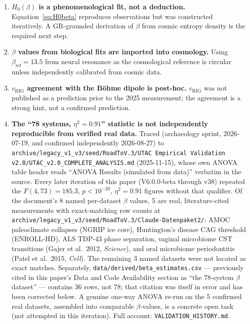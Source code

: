 \documentclass[12pt,a4paper]{article}
\theoremstyle{definition}
\newcommand{\betaref}{\beta_{\mathrm{ref}}}
\newcommand{\vrig}{v_{\mathrm{RIG}}}
\begin{document}
\begin{enumerate}[leftmargin=2em, label=\arabic*.]
  \item \textbf{$H_0(\beta)$ is a phenomenological fit, not a deduction.}
        Equation~\eqref{eq:H0beta} reproduces observations but was
        constructed iteratively. A GR-grounded derivation of $\beta$
        from cosmic entropy density is the required next step.

  \item \textbf{$\beta$ values from biological fits are imported into cosmology.}
        Using $\betaref = 13.5$ from neural resonance as the cosmological
        reference is circular unless independently calibrated from cosmic data.

  \item \textbf{$\vrig$ agreement with the Böhme dipole is post-hoc.}
        $\vrig$ was not published as a prediction prior to the 2025 measurement;
        the agreement is a strong hint, not a confirmed prediction.

  \item \textbf{The ``78 systems, $\eta^2=0.91$'' statistic is not independently
        reproducible from verified real data.}
        Traced (archaeology sprint, 2026-07-19, and confirmed independently
        2026-08-27) to \texttt{archive/legacy\_v1\_v3/seed/RoadToV.3/UTAC Empirical
        Validation v2.0/UTAC\_v2.0\_COMPLETE\_ANALYSIS.md} (2025-11-15), whose own
        ANOVA table header reads ``ANOVA Results (simulated from data)'' verbatim in
        the source. Every later iteration of this paper (V6.0.0-beta through v38)
        repeated the $F(4,73)=185.3$, $p<10^{-20}$, $\eta^2=0.91$ figures without that
        qualifier. Of the document's 8 named per-dataset $\beta$ values, 5 are real,
        literature-cited measurements with exact-matching row counts at
        \texttt{archive/legacy\_v1\_v3/seed/RoadToV.3/Claude-Datenpaket2/}: AMOC
        paleoclimate collapses (NGRIP ice core), Huntington's disease CAG threshold
        (ENROLL-HD), ALS TDP-43 phase separation, vaginal microbiome CST transitions
        (Gajer et al.\ 2012, \textit{Science}), and oral microbiome periodontitis
        (Patel et al.\ 2015, \textit{Cell}). The remaining 3 named datasets were not
        located as exact matches. Separately, \texttt{data/derived/beta\_estimates.csv}
        --- previously cited in this paper's Data and Code Availability section as
        ``the 78-system $\beta$ dataset'' --- contains 36 rows, not 78; that citation
        was itself in error and has been corrected below. A genuine one-way ANOVA
        re-run on the 5 confirmed real datasets, assembled into comparable
        $\beta$-values, is a concrete open task (not attempted in this iteration).
        Full account: \texttt{VALIDATION\_HISTORY.md}.


\end{enumerate}
\end{document}
